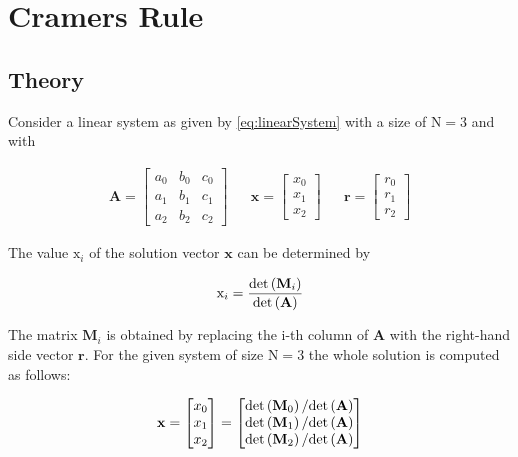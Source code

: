 \newpage
\section{Cramers Rule}
\label{sec:cramersRule}
\subsection{Theory}

Consider a linear system as given by \cref{eq:linearSystem} with a size of $\mathrm{N}=3$ and with


\begin{align*}
\mathbf{A}
=
\begin{bmatrix}
a_0&b_0&c_0\\
a_1&b_1&c_1\\
a_2&b_2&c_2
\end{bmatrix}
&&
\mathbf{x}
=
\begin{bmatrix}
x_0\\
x_1\\
x_2
\end{bmatrix}
&&
\mathbf{r}
=
\begin{bmatrix}
r_0\\
r_1\\
r_2
\end{bmatrix}
\end{align*}

The value $\mathrm{x}_i$ of the solution vector $\mathbf{x}$ can be determined by

\begin{align*}
\mathrm{x}_i = \frac{\mathrm{det}\left(\mathbf{M}_i\right)}{\mathrm{det}\left(\mathbf{A}\right)}
\end{align*}

The matrix $\mathbf{M}_i$ is obtained by replacing the i-th  column of $\mathbf{A}$ with the right-hand side vector $\mathbf{r}$.
For the given system of size  $\mathrm{N}=3$ the whole solution is computed as follows:

\begin{align*}
\mathbf{x}
=
\begin{bmatrix}
x_0\\
x_1\\
x_2
\end{bmatrix}
=
\begin{bmatrix}
\mathrm{det}\left(\mathbf{M}_0\right) / \mathrm{det}\left(\mathbf{A}\right)\\
\mathrm{det}\left(\mathbf{M}_1\right) / \mathrm{det}\left(\mathbf{A}\right)\\
\mathrm{det}\left(\mathbf{M}_2\right) / \mathrm{det}\left(\mathbf{A}\right)\\
\end{bmatrix}
\end{align*}

